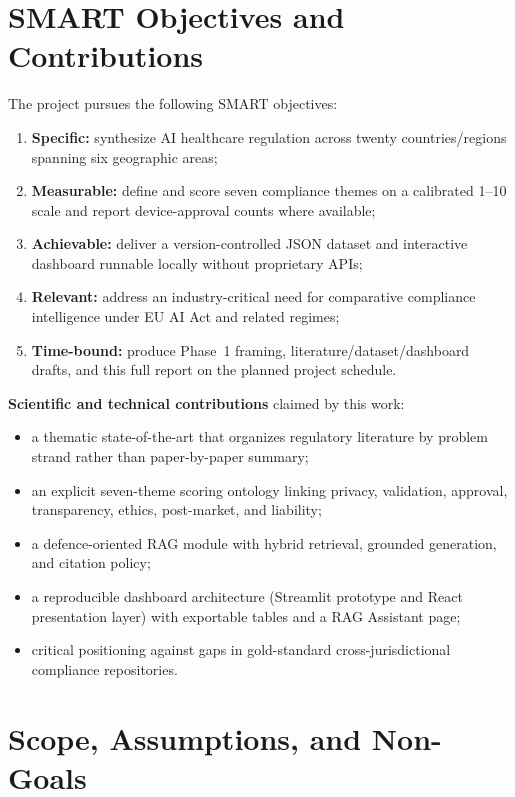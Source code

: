 \section{SMART Objectives and Contributions}
\label{sec:objectives}

The project pursues the following SMART objectives:

\begin{enumerate}[noitemsep]
  \item \textbf{Specific:} synthesize AI healthcare regulation across twenty countries/regions spanning six geographic areas;
  \item \textbf{Measurable:} define and score seven compliance themes on a calibrated 1--10 scale and report device-approval counts where available;
  \item \textbf{Achievable:} deliver a version-controlled JSON dataset and interactive dashboard runnable locally without proprietary APIs;
  \item \textbf{Relevant:} address an industry-critical need for comparative compliance intelligence under EU AI Act and related regimes;
  \item \textbf{Time-bound:} produce Phase~1 framing, literature/dataset/dashboard drafts, and this full report on the planned project schedule.
\end{enumerate}

\textbf{Scientific and technical contributions} claimed by this work:
\begin{itemize}[noitemsep]
  \item a thematic state-of-the-art that organizes regulatory literature by problem strand rather than paper-by-paper summary;
  \item an explicit seven-theme scoring ontology linking privacy, validation, approval, transparency, ethics, post-market, and liability;
  \item a defence-oriented RAG module with hybrid retrieval, grounded generation, and citation policy;
  \item a reproducible dashboard architecture (Streamlit prototype and React presentation layer) with exportable tables and a RAG Assistant page;
  \item critical positioning against gaps in gold-standard cross-jurisdictional compliance repositories.
\end{itemize}

\section{Scope, Assumptions, and Non-Goals}
\label{sec:scope}

